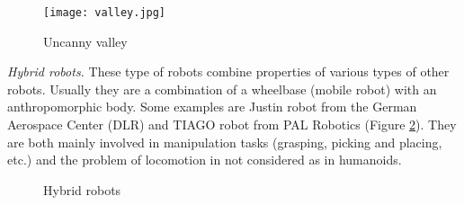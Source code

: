 \begin{figure}[!hbt]
\centering
\texttt{[image: valley.jpg]}
\caption{Uncanny valley}
\label{fig:valley}
\end{figure}


\textit{Hybrid robots.} These type  of robots combine properties of various types of other robots. Usually they are a combination of a wheelbase (mobile robot) with an anthropomorphic body. Some examples are Justin robot from the German Aerospace Center (DLR) and TIAGO robot from PAL Robotics (Figure \ref{fig:hybrid}). They are both mainly involved in manipulation tasks (grasping, picking and placing, etc.) and the problem of locomotion in not considered as in humanoids. 

\begin{figure}[!hbt]
\centering 
{}\hspace{10mm}
\caption{Hybrid robots}
\label{fig:hybrid}
\end{figure}

\newpage












